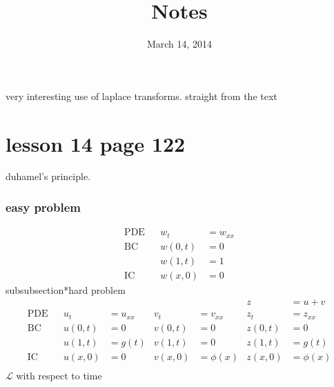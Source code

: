 \documentclass{article}
\begin{document}
\title{Notes}
\date{March 14, 2014}
\maketitle
very interesting use of laplace transforms. straight from the text
\section*{lesson 14 page 122}
duhamel's principle.

\subsubsection*{easy problem}
\begin{align*}
  \text{PDE}&&w_t&=w_{xx}\\
  \text{BC}&&w(0,t)&=0\\
  &&w(1,t)&=1\\
  \text{IC}&&w(x,0)&=0
\end{align*}
subsubsection*{hard problem}
\begin{align*}
  &&&&&&z&=u+v\\
  \text{PDE}&&u_t&=u_{xx}&v_t&=v_{xx}
  &z_t&=z_{xx}\\
  \text{BC}&&u(0,t)&=0&v(0,t)&=0
  &z(0,t)&=0\\
  &&u(1,t)&=g(t)&v(1,t)&=0
  &z(1,t)&=g(t)\\
  \text{IC}&&u(x,0)&=0&v(x,0)&=\phi(x)
  &z(x,0)&=\phi(x)\\
\end{align*}
$\mathcal{L}$ with respect to time
\end{document}
